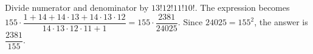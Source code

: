 Divide numerator and denominator by $13!12!11!10!$. The expression becomes $155\cdot\dfrac{1+14+14\cdot13+14\cdot13\cdot12}{14\cdot13\cdot12\cdot11+1}=155\cdot\dfrac{2381}{24025}$. Since $24025=155^2$, the answer is $\boxed{\dfrac{2381}{155}}$.

